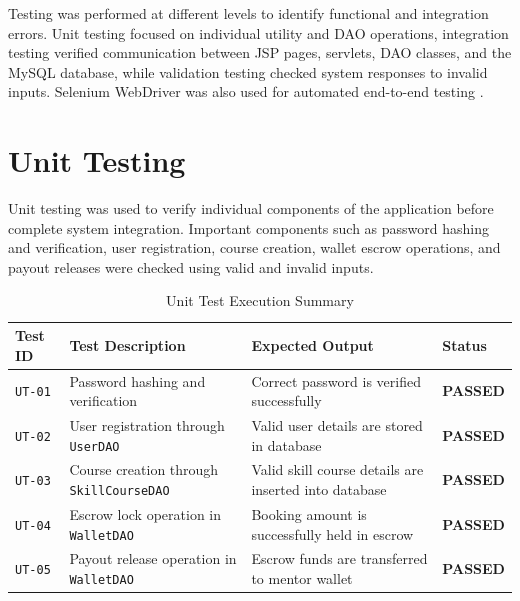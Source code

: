 
Testing was performed at different levels to identify functional and integration errors. Unit testing focused on individual utility and DAO operations, integration testing verified communication between JSP pages, servlets, DAO classes, and the MySQL database, while validation testing checked system responses to invalid inputs. Selenium WebDriver was also used for automated end-to-end testing \cite{seleniumref, pressman}.

\section{Unit Testing}
Unit testing was used to verify individual components of the application before complete system integration. Important components such as password hashing and verification, user registration, course creation, wallet escrow operations, and payout releases were checked using valid and invalid inputs.

\begin{table}[H]
\centering
\small
\caption{Unit Test Execution Summary}
\label{tab:unit_test_summary}
\begin{tabularx}{\textwidth}{|L{2.0cm}|L{4.0cm}|J|C{2.0cm}|}
\hline
\textbf{Test ID} & \textbf{Test Description} & \textbf{Expected Output} & \textbf{Status} \\ \hline
\texttt{UT-01} & Password hashing and verification & Correct password is verified successfully & \textbf{PASSED} \\ \hline
\texttt{UT-02} & User registration through \texttt{UserDAO} & Valid user details are stored in database & \textbf{PASSED} \\ \hline
\texttt{UT-03} & Course creation through \texttt{SkillCourseDAO} & Valid skill course details are inserted into database & \textbf{PASSED} \\ \hline
\texttt{UT-04} & Escrow lock operation in \texttt{WalletDAO} & Booking amount is successfully held in escrow & \textbf{PASSED} \\ \hline
\texttt{UT-05} & Payout release operation in \texttt{WalletDAO} & Escrow funds are transferred to mentor wallet & \textbf{PASSED} \\ \hline
\end{tabularx}
\end{table}

